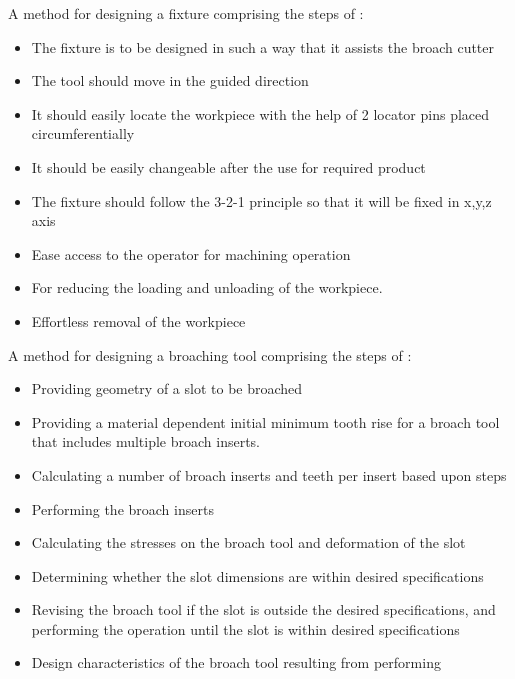 \documentclass[16pt,a4paper]{article}
\begin{document}
A method for designing a fixture comprising the steps of :
\begin{itemize}
\item The fixture is to be designed in such a way that it assists the broach cutter 
\item The tool should move in the guided direction
\item It should easily locate the workpiece with the help of 2 locator pins placed circumferentially
\item It should be easily changeable after the use for required product
\item The fixture should follow the 3-2-1 principle so that it will be fixed in x,y,z axis
\item Ease access to the operator for machining operation
\item For reducing the loading and unloading of the workpiece.
\item Effortless removal of the workpiece
\end{itemize}

A method for designing a broaching tool comprising the steps of :
\begin{itemize}
\item Providing geometry of a slot to be broached
\item Providing a material dependent initial minimum tooth rise for a broach tool that includes multiple broach inserts.
\item Calculating a number of broach inserts and teeth per insert based upon steps
\item Performing the broach inserts 
\item Calculating the stresses on the broach tool and deformation of the slot
\item Determining whether the slot dimensions are within desired specifications 
\item Revising the broach tool if the slot is outside the desired specifications, and performing the operation until the slot is within desired specifications 
\item Design characteristics of the broach tool resulting from performing 
\end{itemize}
\end{document}
